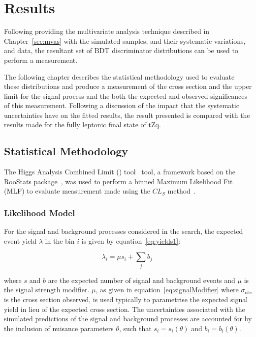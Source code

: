 \chapter{Results}\label{chapter:results}
Following providing the multivariate analysis technique described in Chapter~\ref{sec:mvas} with the simulated samples, and their systematic variations, and data, the resultant set of BDT discriminator distributions can be used to perform a measurement.

The following chapter describes the statistical methodology used to evaluate these distributions and produce a measurement of the cross section and the upper limit for the signal process and the both the expected and observed significances of this measurement.
Following a discussion of the impact that the systematic uncertainties have on the fitted results, the result presented is compared with the results made for the fully leptonic final state of tZq.

\section{Statistical Methodology}\label{sec:statisticalModel}
The Higgs Analysis Combined Limit (\combine) tool~\cite{Combine} tool, a framework based on the RooStats package~\cite{Moneta:2010pm,Schott:2012zb}, was used to perform a binned Maximum Likelihood Fit (MLF) to evaluate measurement made using the $CL_{S}$ method~\cite{CMS-NOTE-2011-005,Khachatryan:2014jba,Cowan:2010js}.

\subsection{Likelihood Model}\label{subsec:likelihoodModel}
For the signal and background processes considered in the search, the expected event yield $\lambda$ in the bin $i$ is given by equation~\ref{eq:yields1}:

\begin{equation}
\lambda_{i} = \mu s_{i} + \sum\limits_{j} b_{j} \;
\label{eq:yields1}
\end{equation}

where $s$ and $b$ are the expected number of signal and background events and $\mu$ is the signal strength modifier.
$\mu$, as given in equation~\ref{eq:signalModifier} where $\sigma_{obs}$ is the cross section observed, is used typically to parametrise the expected signal yield in lieu of the expected cross section.
The uncertainties associated with the simulated predictions of the signal and background processes are accounted for by the inclusion of nuisance parameters $\theta$, such that $s_{i} = s_{i} (\theta)$ and $b_{i} = b_{i} (\theta)$.


